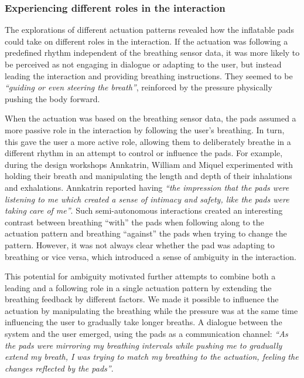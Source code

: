 \subsubsection*{Experiencing different roles in the interaction}

The explorations of different actuation patterns revealed how the inflatable pads could take on different roles in the interaction. If the actuation was following a predefined rhythm independent of the breathing sensor data, it was more likely to be perceived as not engaging in dialogue or adapting to the user, but instead leading the interaction and providing breathing instructions. They seemed to be \textit{``guiding or even steering the breath''}, reinforced by the pressure physically pushing the body forward.

When the actuation was based on the breathing sensor data, the pads assumed a more passive role in the interaction by following the user’s breathing. In turn, this gave the user a more active role, allowing them to deliberately breathe in a different rhythm in an attempt to control or influence the pads. For example, during the design workshops Annkatrin, William and Miquel experimented with holding their breath and manipulating the length and depth of their inhalations and exhalations. Annkatrin reported having \textit{``the impression that the pads were listening to me which created a sense of intimacy and safety, like the pads were taking care of me''}. Such semi-autonomous interactions created an interesting contrast between breathing “with” the pads when following along to the actuation pattern and breathing “against” the pads when trying to change the pattern. However, it was not always clear whether the pad was adapting to breathing or vice versa, which introduced a sense of ambiguity in the interaction.

This potential for ambiguity motivated further attempts to combine both a leading and a following role in a single actuation pattern by extending the breathing feedback by different factors. We made it possible to influence the actuation by manipulating the breathing while the pressure was at the same time influencing the user to gradually take longer breaths. A dialogue between the system and the user emerged, using the pads as a communication channel: \textit{``As the pads were mirroring my breathing intervals while pushing me to gradually extend my breath, I was trying to match my breathing to the actuation, feeling the changes reflected by the pads''}.

